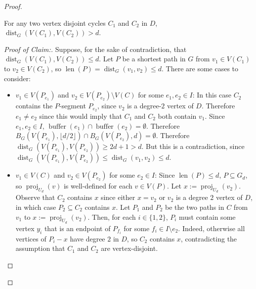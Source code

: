 \documentclass{patmorin}
\newenvironment{clmproof}{\begin{proof}[Proof of Claim:]\renewcommand{\qedsymbol}{\rule{1ex}{1ex}}}{\end{proof}}
\DeclareMathOperator{\len}{len}
\DeclareMathOperator{\buffer}{buffer}
\DeclareMathOperator{\proj}{proj}
\DeclareMathOperator{\dist}{dist}
\begin{document}
\begin{proof}
  \begin{clm}\label{cycles_are_distance_d}
    For any two vertex disjoint cycles $C_1$ and $C_2$ in $D$, $\dist_G(V(C_1),V(C_2))> d$.
  \end{clm}

  \begin{clmproof}
    Suppose, for the sake of contradiction, that $\dist_G(V(C_1),V(C_2))\le d$. Let $P$ be a shortest path in $G$ from $v_1\in V(C_1)$ to $v_2\in V(C_2)$, so $\len(P)=\dist_G(v_1,v_2)\le d$.  There are some cases to consider:
    \begin{itemize}

      \item $v_1\in V(P_{e_1})$ and $v_2\in V(P_{e_2})\setminus V(C)$ for some $e_1,e_2\in I$:  In this case $C_2$ contains the $P$-segment $P_{e_2}$, since $v_2$ is a degree-$2$ vertex of $D$.  Therefore $e_1\neq e_2$ since this would imply that $C_1$ and $C_2$ both contain $v_1$.  Since $e_1,e_2\in I$, $\buffer(e_1)\cap\buffer(e_2)=\emptyset$.  Therefore $B_G(V(P_{e_1}),\lfloor d/2\rfloor)\cap B_G(V(P_{e_2}),d)=\emptyset$. Therefore $\dist_G(V(P_{e_1}),V(P_{e_2}))\ge 2d + 1> d$.  But this is a contradiction, since $\dist_G(V(P_{e_1}),V(P_{e_2}))\le \dist_G(v_1,v_2)\le d$.

      \item $v_1\in V(C)$ and $v_2\in V(P_{e_2})$ for some $e_2\in I$:
      Since $\len(P)\le d$, $P\subseteq G_d$, so $\proj_{U_d}(v)$ is well-defined for each $v\in V(P)$.  Let $x:=\proj_{U_d}(v_2)$.  Observe that $C_2$ contains $x$ since either $x=v_2$ or $v_2$ is a degree $2$ vertex of $D$, in which case $P_2\subseteq C_2$ contains $x$.  Let $P_1$ and $P_2$ be the two paths in $C$ from $v_1$ to $x:=\proj_{U_d}(v_2)$.
      Then, for each $i\in\{1,2\}$, $P_i$ must contain some vertex $y_i$ that is an endpoint of $P_{f_i}$ for some $f_i\in I\setminus e_2$. Indeed, otherwise all vertices of $P_i-x$ have degree $2$ in $D$, so $C_2$ contains $x$, contradicting the assumption that $C_1$ and $C_2$ are vertex-disjoint.


\end{itemize}
\end{clmproof}
\end{proof}
\end{document}
